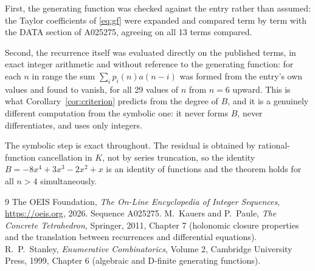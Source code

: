 \documentclass[11pt,a4paper]{article}
\theoremstyle{plain}
\theoremstyle{definition}
\begin{document}
First, the generating function was checked against the entry rather than assumed: the
Taylor coefficients of \eqref{eq:gf} were expanded and compared term by term with the DATA
section of A025275, agreeing on all 13 terms compared.

Second, the recurrence itself was evaluated directly on the published terms, in exact
integer arithmetic and without reference to the generating function: for each $n$ in range
the sum $\sum_{i}p_{i}(n)a(n-i)$ was formed from the entry's own values and found to
vanish, for all 29 values of $n$ from $n=6$ upward. This is what
Corollary~\ref{cor:criterion} predicts from the degree of $B$, and it is a genuinely
different computation from the symbolic one: it never forms $B$, never differentiates, and
uses only integers.

The symbolic step is exact throughout. The residual is obtained by rational-function
cancellation in $K$, not by series truncation, so the identity $B=- 8 x^{4} + 3 x^{3} - 2 x^{2} + x$ is an
identity of functions and the theorem holds for all $n>4$ simultaneously.

\begin{thebibliography}{9}
 The OEIS Foundation, \emph{The On-Line Encyclopedia of Integer Sequences},
\url{https://oeis.org}, 2026. Sequence A025275.
 M.~Kauers and P.~Paule, \emph{The Concrete Tetrahedron}, Springer, 2011,
Chapter 7 (holonomic closure properties and the translation between recurrences and
differential equations).
 R.~P.~Stanley, \emph{Enumerative Combinatorics}, Volume 2, Cambridge
University Press, 1999, Chapter 6 (algebraic and D-finite generating functions).
\end{thebibliography}
\end{document}
